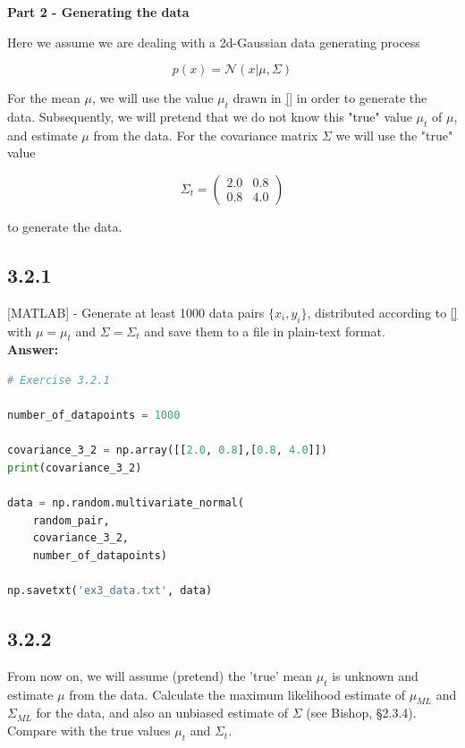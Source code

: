 \documentclass[a4paper]{article}
\begin{document}
\textbf{Part 2 - Generating the data}

Here we assume we are dealing with a 2d-Gaussian data generating process

\begin{equation}
	p(x) = \mathcal{N}(x|\mu, \Sigma)
\end{equation}

For the mean $\mu$, we will use the value $\mu_t$ drawn in \ref{} in order to generate the data. Subsequently, we will pretend that we do not know this "true" value $\mu_t$ of $\mu$, and estimate $\mu$ from the data. For the covariance matrix $\Sigma$ we will use the "true" value

\[ \Sigma_t = \left( \begin{array}{cc}
2.0 & 0.8  \\
0.8 & 4.0 \end{array} \right)\] 

to generate the data.


\subsection*{3.2.1}

[MATLAB] - Generate at least 1000 data pairs $\{ x_i, y_i\}$, distributed according to \ref{} with $\mu = \mu_t$ and $\Sigma = \Sigma_t$ and save them to a file in plain-text format.\\

\textbf{Answer:}\\

\begin{lstlisting}[language=Python]
# Exercise 3.2.1

number_of_datapoints = 1000

covariance_3_2 = np.array([[2.0, 0.8],[0.8, 4.0]])
print(covariance_3_2)

data = np.random.multivariate_normal(
    random_pair,
    covariance_3_2,
    number_of_datapoints)

np.savetxt('ex3_data.txt', data)
\end{lstlisting}



\subsection*{3.2.2}

From now on, we will assume (pretend) the 'true' mean $\mu_t$ is unknown and estimate $\mu$ from the data. Calculate the maximum likelihood estimate of $\mu_{ML}$ and $\Sigma_{ML}$ for the data, and also an unbiased estimate of $\Sigma$ (see Bishop, §2.3.4). Compare with the true values $\mu_t$ and $\Sigma_t$.\\
\end{document}
